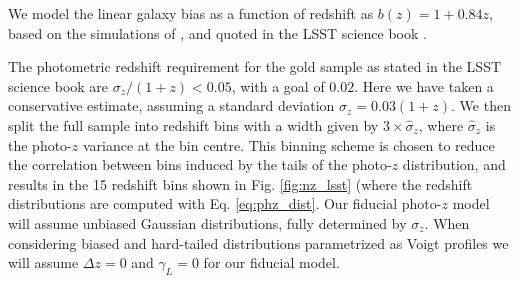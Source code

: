 \documentclass[prd,twocolumn]{revtex4}
\begin{document}
    We model the linear galaxy bias as a function of redshift as $b(z)=1+0.84z$, based
    on the simulations of \cite{2004ApJ...601....1W}, and quoted in the LSST science book
    \cite{2009arXiv0912.0201L}.
    
    The photometric redshift requirement for the gold sample as stated in the LSST science
    book are $\sigma_z/(1+z)<0.05$, with a goal of $0.02$. Here we have taken a conservative
    estimate, assuming a standard deviation $\sigma_z=0.03(1+z)$. We then split the full
    sample into redshift bins with a width given by $3\times\hat{\sigma}_z$, where
    $\hat{\sigma}_z$ is the photo-$z$ variance at the bin centre. This binning scheme is
    chosen to reduce the correlation between bins induced by the tails of the photo-$z$
    distribution, and results in the 15 redshift bins shown in Fig. \ref{fig:nz_lsst} (where
    the redshift distributions are computed with Eq. \ref{eq:phz_dist}. Our fiducial
    photo-$z$ model will assume unbiased Gaussian distributions, fully determined by
    $\sigma_z$. When considering biased and hard-tailed distributions parametrized as
    Voigt profiles we will assume $\Delta z=0$ and $\gamma_L=0$ for our fiducial
    model.
\end{document}
